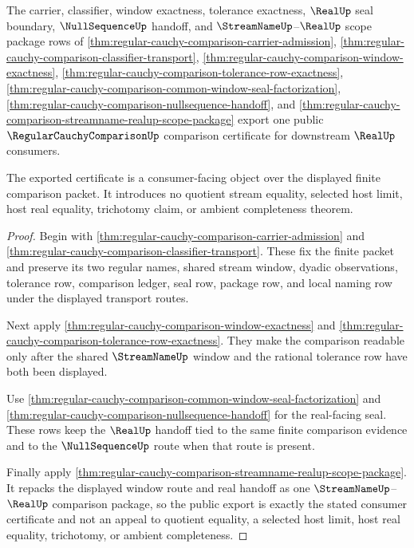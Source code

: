 \begin{theorem}
\label{thm:regular-cauchy-comparison-public-export-certificate}
The carrier, classifier, window exactness, tolerance exactness, $\RealUp$ seal boundary, $\NullSequenceUp$ handoff, and $\StreamNameUp$--$\RealUp$ scope package rows of \autoref{thm:regular-cauchy-comparison-carrier-admission}, \autoref{thm:regular-cauchy-comparison-classifier-transport}, \autoref{thm:regular-cauchy-comparison-window-exactness}, \autoref{thm:regular-cauchy-comparison-tolerance-row-exactness}, \autoref{thm:regular-cauchy-comparison-common-window-seal-factorization}, \autoref{thm:regular-cauchy-comparison-nullsequence-handoff}, and \autoref{thm:regular-cauchy-comparison-streamname-realup-scope-package} export one public $\RegularCauchyComparisonUp$ comparison certificate for downstream $\RealUp$ consumers.

The exported certificate is a consumer-facing object over the displayed finite comparison packet. It introduces no quotient stream equality, selected host limit, host real equality, trichotomy claim, or ambient completeness theorem.
\end{theorem}
\begin{proof}
Begin with \autoref{thm:regular-cauchy-comparison-carrier-admission} and \autoref{thm:regular-cauchy-comparison-classifier-transport}. These fix the finite packet and preserve its two regular names, shared stream window, dyadic observations, tolerance row, comparison ledger, seal row, package row, and local naming row under the displayed transport routes.

Next apply \autoref{thm:regular-cauchy-comparison-window-exactness} and \autoref{thm:regular-cauchy-comparison-tolerance-row-exactness}. They make the comparison readable only after the shared $\StreamNameUp$ window and the rational tolerance row have both been displayed.

Use \autoref{thm:regular-cauchy-comparison-common-window-seal-factorization} and \autoref{thm:regular-cauchy-comparison-nullsequence-handoff} for the real-facing seal. These rows keep the $\RealUp$ handoff tied to the same finite comparison evidence and to the $\NullSequenceUp$ route when that route is present.

Finally apply \autoref{thm:regular-cauchy-comparison-streamname-realup-scope-package}. It repacks the displayed window route and real handoff as one $\StreamNameUp$--$\RealUp$ comparison package, so the public export is exactly the stated consumer certificate and not an appeal to quotient equality, a selected host limit, host real equality, trichotomy, or ambient completeness.
\end{proof}

